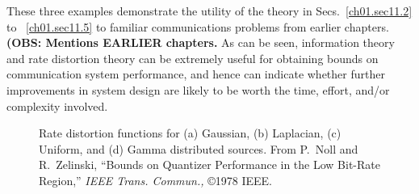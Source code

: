 These three examples demonstrate the utility of the theory
in Secs.~\ref{ch01.sec11.2} to ~\ref{ch01.sec11.5} to familiar
communications problems from earlier chapters.
\textbf{(OBS: Mentions EARLIER chapters.}
As can be seen,  information theory and rate distortion theory
can be extremely useful for obtaining bounds on communication system
performance, and hence can indicate whether further improvements
in system design  are likely to be worth the time, effort, and/or
complexity involved.

\begin{figure}[hbt] %
 \figboxes
\caption{Rate distortion functions for (a) Gaussian,
        (b) Laplacian, (c) Uniform, and (d) Gamma distributed sources.
        From P.\ Noll and R.\ Zelinski,
        ``Bounds on Quantizer Performance in the Low Bit-Rate Region,''
        \textit{IEEE Trans. Commun.,} \copyright 1978 IEEE.
\label{ch01.fig11.6.1} }
\end{figure}

\begin{table}[hbt]
\caption{SQNR (dB) Comparison of $R(D)$ and
  Optimum \protect\newline Quantizer
  Performance for Gaussian and Laplacian Sources}
\label{ch01.tab2} 
\end{table}


